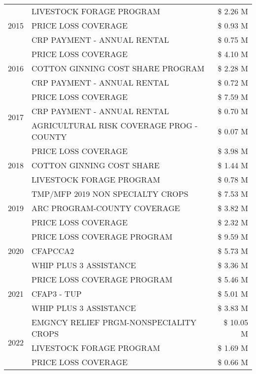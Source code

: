 \begin{tabular}{llr}
\cline{1-3}
\multirow[t]{3}{*}{2015} & LIVESTOCK FORAGE PROGRAM & \$ 2.26 M \\
 & PRICE LOSS COVERAGE & \$ 0.93 M \\
 & CRP PAYMENT - ANNUAL RENTAL & \$ 0.75 M \\
\cline{1-3}
\multirow[t]{3}{*}{2016} & PRICE LOSS COVERAGE & \$ 4.10 M \\
 & COTTON GINNING COST SHARE PROGRAM & \$ 2.28 M \\
 & CRP PAYMENT - ANNUAL RENTAL & \$ 0.72 M \\
\cline{1-3}
\multirow[t]{3}{*}{2017} & PRICE LOSS COVERAGE & \$ 7.59 M \\
 & CRP PAYMENT - ANNUAL RENTAL & \$ 0.70 M \\
 & AGRICULTURAL RISK COVERAGE PROG - COUNTY & \$ 0.07 M \\
\cline{1-3}
\multirow[t]{3}{*}{2018} & PRICE LOSS COVERAGE & \$ 3.98 M \\
 & COTTON GINNING COST SHARE & \$ 1.44 M \\
 & LIVESTOCK FORAGE PROGRAM & \$ 0.78 M \\
\cline{1-3}
\multirow[t]{3}{*}{2019} & TMP/MFP 2019 NON SPECIALTY CROPS & \$ 7.53 M \\
 & ARC PROGRAM-COUNTY COVERAGE & \$ 3.82 M \\
 & PRICE LOSS COVERAGE & \$ 2.32 M \\
\cline{1-3}
\multirow[t]{3}{*}{2020} & PRICE LOSS COVERAGE PROGRAM & \$ 9.59 M \\
 & CFAPCCA2 & \$ 5.73 M \\
 & WHIP PLUS 3 ASSISTANCE & \$ 3.36 M \\
\cline{1-3}
\multirow[t]{3}{*}{2021} & PRICE LOSS COVERAGE PROGRAM & \$ 5.46 M \\
 & CFAP3 - TUP & \$ 5.01 M \\
 & WHIP PLUS 3 ASSISTANCE & \$ 3.83 M \\
\cline{1-3}
\multirow[t]{3}{*}{2022} & EMGNCY RELIEF PRGM-NONSPECIALITY CROPS & \$ 10.05 M \\
 & LIVESTOCK FORAGE PROGRAM & \$ 1.69 M \\
 & PRICE LOSS COVERAGE & \$ 0.66 M \\
\cline{1-3}
\bottomrule
\end{tabular}
